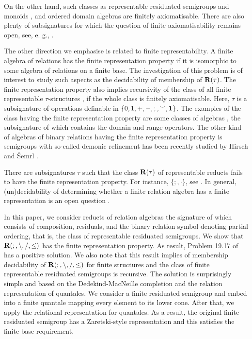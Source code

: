 \documentclass[a4paper]{article}
\theoremstyle{definition}
\theoremstyle{theorem}
\theoremstyle{proposition}
\theoremstyle{lemma}
\theoremstyle{ex}
\theoremstyle{corollary}
\theoremstyle{claim}
\begin{document}
On the other hand, such classes as representable residuated semigroups and monoids \cite{andreka1994lambek}, and ordered domain algebras \cite{hirsch2013ordered} are finitely axiomatisable. There are also plenty of subsignatures for which the question of finite axiomatisability remains open, see, e. g., \cite{andreka2011axiomatizability}.

The other direction we emphasise is related to finite representability. A finite algebra of relations has the finite representation property if it is isomorphic to some algebra of relations on a finite base. The investigation of this problem is of interest to study such aspects as the decidability of membership of ${\bf R}(\tau)$. The finite representation property also implies recursivity of the class of all finite representable $\tau$-structures \cite{hirsch2004finite}, if the whole class is finitely axiomatisable.  Here, $\tau$ is a subsignature of operations definable in $\{ 0, 1, +, -, ;, {}^{\smile}, {\bf 1 } \}$. The examples of the class having the finite representation property are some classes of algebras \cite{hirsch2004finite} \cite{hirsch2013ordered} \cite{mclean2016finite}, the subsignature of which contains the domain and range operators. The other kind of algebras of binary relations having the finite representation property is semigroups with so-called demonic refinement has been recently studied by Hirsch and \v{S}emrl \cite{hirsch2020finite}.

There are subsignatures $\tau$ such that the class ${\bf R}(\tau)$ of representable reducts fails to have the finite representation property. For instance, $\{;, \cdot\}$, see \cite{maddux2016finite}. In general, (un)decidability of determining whether a finite relation algebra has a finite representation is an open question \cite[Problem 18.18]{hirsch2002relation}.

In this paper, we consider reducts of relation algebras the signature of which consists of composition, residuals, and the binary relation symbol denoting partial ordering, that is, the class of representable residuated semigroups. We show that ${\bf R}(;, \setminus, /, \leq)$ has the finite representation property. As result, Problem 19.17 of \cite{hirsch2002relation} has a positive solution. We also note that this result implies of membership decidability of ${\bf R}(;, \setminus, /, \leq)$ for finite structures and the class of finite representable residuated semigroups is recursive. The solution is surprisingly simple and based on the Dedekind-MacNeille completion and the relation representation of quantales. We consider a finite residuated semigroup and embed into a finite quantale mapping every element to its lower cone. After that, we apply the relational representation for quantales. As a result, the original finite residuated semigroup has a Zaretski-style representation \cite{zaretskii1959representation} and this satisfies the finite base requirement.
\end{document}
